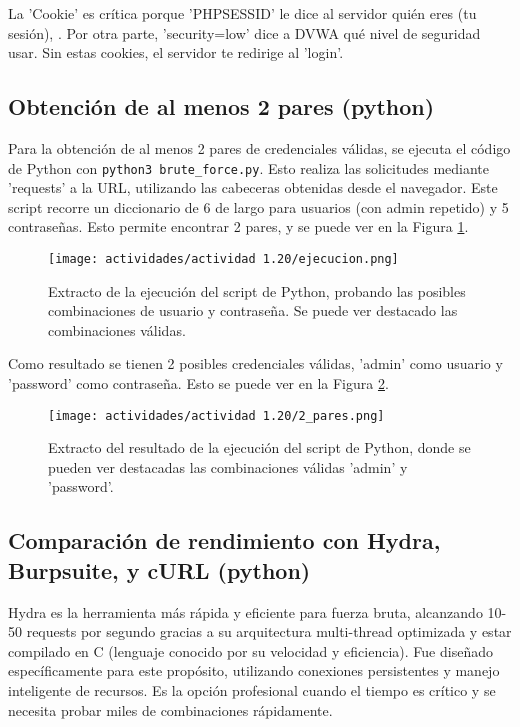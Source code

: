 \documentclass[letter,12pt]{article}
\begin{document}
La 'Cookie' es crítica porque 'PHPSESSID' le dice al servidor quién eres (tu sesión), . Por otra parte, 'security=low' dice a DVWA qué nivel de seguridad usar. Sin estas cookies, el servidor te redirige al 'login'.

\subsection{Obtención de al menos 2 pares (python)}
Para la obtención de al menos 2 pares de credenciales válidas, se ejecuta el código de Python con \verb|python3 brute_force.py|. Esto realiza las solicitudes mediante 'requests' a la URL, utilizando las cabeceras obtenidas desde el navegador. Este script recorre un diccionario de 6 de largo para usuarios (con admin repetido) y 5 contraseñas. Esto permite encontrar 2 pares, y se puede ver en la Figura \ref{actividad 1.20 ejecucion}.

\begin{figure}[H]
    \centering
    \texttt{[image: actividades/actividad 1.20/ejecucion.png]}  
    \caption{Extracto de la ejecución del script de Python, probando las posibles combinaciones de usuario y contraseña. Se puede ver destacado las combinaciones válidas.}
    \label{actividad 1.20 ejecucion}
\end{figure}

Como resultado se tienen 2 posibles credenciales válidas, 'admin' como usuario y 'password' como contraseña. Esto se puede ver en la Figura \ref{actividad 1.20 2_pares}.

\begin{figure}[H]
    \centering
    \texttt{[image: actividades/actividad 1.20/2\_pares.png]}  
    \caption{Extracto del resultado de la ejecución del script de Python, donde se pueden ver destacadas las combinaciones válidas 'admin' y 'password'.}
    \label{actividad 1.20 2_pares}
\end{figure}

\subsection{Comparación de rendimiento con Hydra, Burpsuite, y cURL (python)}
Hydra es la herramienta más rápida y eficiente para fuerza bruta, alcanzando 10-50 requests por segundo gracias a su arquitectura multi-thread optimizada y estar compilado en C (lenguaje conocido por su velocidad y eficiencia). Fue diseñado específicamente para este propósito, utilizando conexiones persistentes y manejo inteligente de recursos. Es la opción profesional cuando el tiempo es crítico y se necesita probar miles de combinaciones rápidamente.
\end{document}
